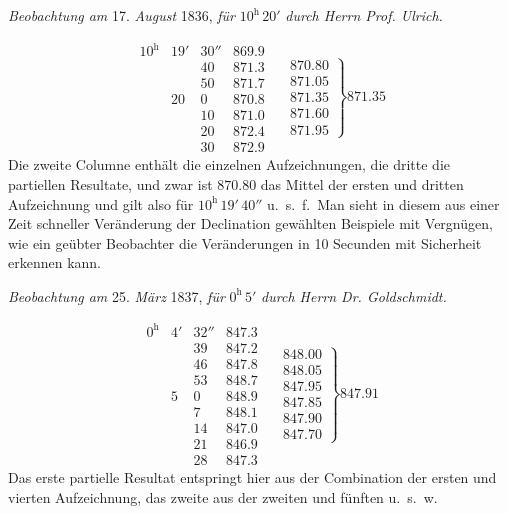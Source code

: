 \begin{center}\textit{Beobachtung am} 17. \textit{August} 1836, \textit{für} $10^{\mathrm h}\,20'$ \textit{durch Herrn Prof. Ulrich.}\end{center}
\[
\begin{array}{rrr|r|}
10^{\mathrm h}&19'&30''&869.9\\
&&40&871.3\\
&&50&871.7\\
&20&0&870.8\\
&&10&871.0\\
&&20&872.4\\
&&30&872.9
\end{array}\quad
\left.\begin{array}{r}870.80\\871.05\\871.35\\871.60\\871.95\end{array}\right\}871.35
\]
Die zweite Columne enthält die einzelnen Aufzeichnungen, die dritte die partiellen Resultate, und zwar ist $870.80$ das Mittel der ersten und dritten Aufzeichnung und gilt also für $10^{\mathrm h}\,19'\,40''$ u.\ s.\ f.\ Man sieht in diesem aus einer Zeit schneller Veränderung der Declination gewählten Beispiele mit Vergnügen, wie ein geübter Beobachter die Veränderungen in 10 Secunden mit Sicherheit erkennen kann.

\begin{center}\textit{Beobachtung am} 25. \textit{März} 1837, \textit{für} $0^{\mathrm h}\,5'$ \textit{durch Herrn Dr. Goldschmidt.}\end{center}
\[
\begin{array}{rrr|r|}
0^{\mathrm h}&4'&32''&847.3\\
&&39&847.2\\
&&46&847.8\\
&&53&848.7\\
&5&0&848.9\\
&&7&848.1\\
&&14&847.0\\
&&21&846.9\\
&&28&847.3
\end{array}\quad
\left.\begin{array}{r}848.00\\848.05\\847.95\\847.85\\847.90\\847.70\end{array}\right\}847.91
\]
Das erste partielle Resultat entspringt hier aus der Combination der ersten und vierten Aufzeichnung, das zweite aus der zweiten und fünften u.\ s.\ w.

